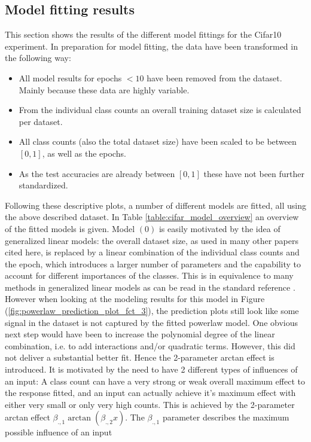 \documentclass{article} %
\begin{document}
\subsection{Model fitting results}

This section shows the results of the different model fittings for the Cifar10 experiment. In preparation for model fitting, the data have been transformed in the following way:
\begin{itemize}
    \item All model results for epochs $< 10$ have been removed from the dataset. Mainly because these data are highly variable.
    \item From the individual class counts an overall training dataset size is calculated per dataset.
    \item All class counts (also the total dataset size) have been scaled to be between $[0, 1]$, as well as the epochs.
    \item As the test accuracies are already between $[0,1]$ these have not been further standardized.
\end{itemize}
Following these descriptive plots, a number of different models are fitted, all using the above described dataset.
In Table \ref{table:cifar_model_overview} an overview of the fitted models is given.
Model $(0)$ is easily motivated by the idea of generalized linear models: the overall dataset size, as used in many other papers cited here, is replaced by a linear combination of the individual class counts and the epoch, which introduces a larger number of parameters and the capability to account for different importances of the classes. 
This is in equivalence to many methods in generalized linear models as can be read in the standard reference \cite{GeneralizedLinearModels}.
However when looking at the modeling results for this model in Figure (\ref{fig:powerlaw_prediction_plot_fct_3}), the prediction plots still look like some signal in the dataset is not captured by the fitted powerlaw model.
One obvious next step would have been to increase the polynomial degree of the linear combination, i.e. to add interactions and/or quadratic terms. However, this did not deliver a substantial better fit.
Hence the 2-parameter arctan effect is introduced. It is motivated by the need to have 2 different types of influences of an input: 
A class count can have a very strong or weak overall maximum effect to the response fitted, and an input can actually achieve it's maximum effect with either very small or only very high counts.
This is achieved by the 2-parameter arctan effect $\beta_{., 1} \arctan{(\beta_{., 2} x)}$. The $\beta_{.,1}$ parameter describes the maximum possible influence of an input 
\end{document}
